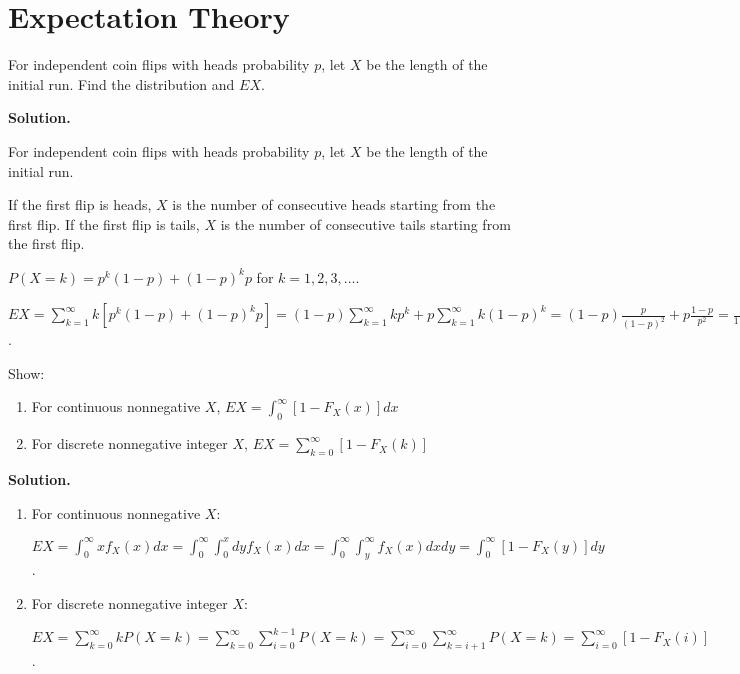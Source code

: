 \section{Expectation Theory}

\begin{problembox}
For independent coin flips with heads probability $p$, let $X$ be the length of the initial run. Find the distribution and $EX$.
\end{problembox}

\noindent\textbf{Solution.}

For independent coin flips with heads probability $p$, let $X$ be the length of the initial run.

If the first flip is heads, $X$ is the number of consecutive heads starting from the first flip.
If the first flip is tails, $X$ is the number of consecutive tails starting from the first flip.

$P(X = k) = p^k(1-p) + (1-p)^kp$ for $k = 1, 2, 3, \ldots$.

$EX = \sum_{k=1}^\infty k[p^k(1-p) + (1-p)^kp] = (1-p)\sum_{k=1}^\infty kp^k + p\sum_{k=1}^\infty k(1-p)^k = (1-p)\frac{p}{(1-p)^2} + p\frac{1-p}{p^2} = \frac{p}{1-p} + \frac{1-p}{p} = \frac{p^2 + (1-p)^2}{p(1-p)}$.

\begin{problembox}
Show:
\begin{enumerate}[label=(\alph*)]
    \item For continuous nonnegative $X$, $EX = \int_0^\infty [1-F_X(x)]dx$
    \item For discrete nonnegative integer $X$, $EX = \sum_{k=0}^\infty [1-F_X(k)]$
\end{enumerate}
\end{problembox}

\noindent\textbf{Solution.}
\begin{enumerate}[label=(\alph*)]
    \item For continuous nonnegative $X$:
    
    $EX = \int_0^\infty x f_X(x)dx = \int_0^\infty \int_0^x dy f_X(x)dx = \int_0^\infty \int_y^\infty f_X(x)dx dy = \int_0^\infty [1-F_X(y)]dy$.
    
    \item For discrete nonnegative integer $X$:
    
    $EX = \sum_{k=0}^\infty k P(X=k) = \sum_{k=0}^\infty \sum_{i=0}^{k-1} P(X=k) = \sum_{i=0}^\infty \sum_{k=i+1}^\infty P(X=k) = \sum_{i=0}^\infty [1-F_X(i)]$.
\end{enumerate}

